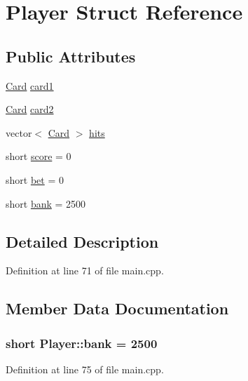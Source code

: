 \hypertarget{struct_player}{}\section{Player Struct Reference}
\label{struct_player}
\subsection*{Public Attributes}
\begin{DoxyCompactItemize}
\item 
\hyperlink{struct_card}{Card} \hyperlink{struct_player_ad54463a3ff6b1145bdd275751003f14d}{card1}
\item 
\hyperlink{struct_card}{Card} \hyperlink{struct_player_aadced5e23c348cdc02ba693ddc442c2b}{card2}
\item 
vector$<$ \hyperlink{struct_card}{Card} $>$ \hyperlink{struct_player_a337fa6c934d99d50d4d7e0da2380d43d}{hits}
\item 
short \hyperlink{struct_player_af90f47d3d6306361df521135f6f1016d}{score} = 0
\item 
short \hyperlink{struct_player_a485c5647a88538b223036a59f2896642}{bet} = 0
\item 
short \hyperlink{struct_player_a726bad04edf5c37e6fa0c5b35d3d8fd5}{bank} = 2500
\end{DoxyCompactItemize}


\subsection{Detailed Description}


Definition at line 71 of file main.\+cpp.



\subsection{Member Data Documentation}
\subsubsection[{\texorpdfstring{bank}{bank}}]{\setlength{\rightskip}{0pt plus 5cm}short Player\+::bank = 2500}\hypertarget{struct_player_a726bad04edf5c37e6fa0c5b35d3d8fd5}{}\label{struct_player_a726bad04edf5c37e6fa0c5b35d3d8fd5}


Definition at line 75 of file main.\+cpp.

